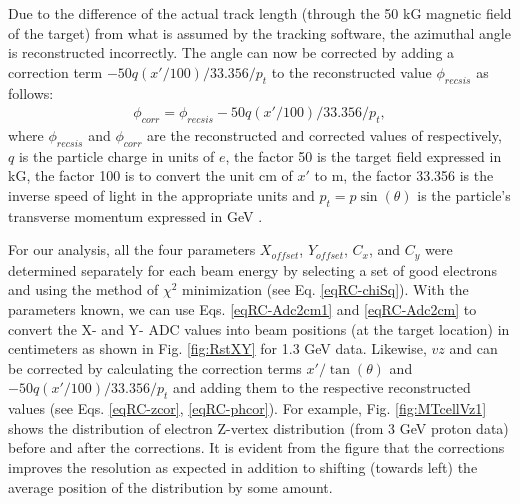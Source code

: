 Due to the difference of the actual track length (through the 50 kG magnetic field of the target) from what is assumed by the tracking software, the azimuthal angle \phs is reconstructed incorrectly. The angle \phs can now be corrected by adding a correction term $- 50 q (x'/100)/33.356/p_t$ to the reconstructed value $\phi_{recsis}$ as follows:
\begin{eqnarray}
\label{eqRC-phcor}
\phi_{corr} = \phi_{recsis} - 50 q (x'/100)/33.356/p_t,
\end{eqnarray}
where $\phi_{recsis}$ and $\phi_{corr}$ are the reconstructed and corrected values of \phs respectively, $q$ is the particle charge in units of $e$, the factor 50 is the target field expressed in kG, the factor 100 is to convert the unit cm of $x'$ to m, the factor 33.356 is the inverse speed of light in the appropriate units and $p_t=p \sin(\theta)$ is the particle's transverse momentum expressed in GeV \cite{rstcor_cn}.

For our analysis, all the four parameters $X_{offset}$, $Y_{offset}$, $C_x$, and $C_y$ were determined separately for each beam energy by selecting a set of good electrons and using the method of $\chi^2$ minimization (see Eq. \ref{eqRC-chiSq}). With the parameters known, we can use Eqs. \ref{eqRC-Adc2cm1} and \ref{eqRC-Adc2cm} to convert the X- and Y- ADC values into beam positions (at the target location) in centimeters as shown in Fig. \ref{fig:RstXY} for 1.3 GeV data. Likewise,  $vz$ and \phs can be corrected by calculating the correction terms $x'/\tan(\theta)$ and $- 50 q (x'/100)/33.356/p_t$ and adding them to the respective reconstructed values (see Eqs. \ref{eqRC-zcor}, \ref{eqRC-phcor}). For example, Fig. \ref{fig:MTcellVz1} shows the distribution of electron Z-vertex distribution (from 3 GeV proton data) before and after the corrections. It is evident from the figure that the corrections improves the resolution as expected in addition to shifting (towards left) the average position of the distribution by some amount.
